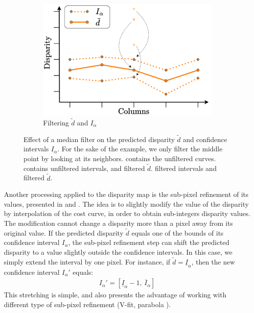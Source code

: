 \begin{figure}
\begin{subfigure}[t]{0.32\linewidth}
        \includegraphics[width=\linewidth]{Images/Chap_5/Median_filtering_3.png}
        \caption{Filtering $\tilde{d}$ and $I_\alpha$}
        \label{fig:median_filtering_3}
    \end{subfigure}
    \caption{Effect of a median filter on the predicted disparity $\tilde{d}$ and confidence intervals $I_\alpha$. For the sake of the example, we only filter the middle point by looking at its neighbors.  contains the unfiltered curves.  contains unfiltered intervals, and filtered $\tilde{d}$.  filtered intervals and filtered $\tilde{d}$.}
    \label{fig:median_filtering}
\end{figure}

Another processing applied to the disparity map is the sub-pixel refinement of its values, presented in  and . The idea is to slightly modify the value of the disparity by interpolation of the cost curve, in order to obtain sub-integers disparity values. The modification cannot change a disparity more than a pixel away from its original value. If the predicted disparity $\tilde{d}$ equals one of the bounds of its confidence interval $I_\alpha$, the sub-pixel refinement step can shift the predicted disparity to a value slightly outside the confidence intervals. In this case, we simply extend the interval by one pixel. For instance, if $\tilde{d}=\underline{I}_\alpha$, then the new confidence interval $I_\alpha'$ equals:
\begin{align}
    I_\alpha'=[\underline{I}_\alpha-1,~\overline{I}_\alpha]
\end{align}
This stretching is simple, and also presents the advantage of working with different type of sub-pixel refinement (\ie V-fit, parabola \etc).

